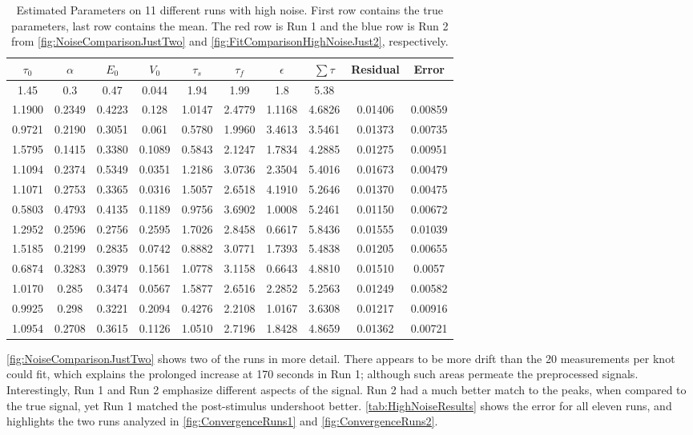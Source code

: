 \begin{table}[t]
\centering
\begin{tabular}{|c | c | c | c | c | c | c | c | c | c |}
\hline
$\tau_0$ & $\alpha$ & $E_0$    & $V_0$    & $\tau_s$ & $\tau_f$ & $\epsilon$  & $ \sum \tau $ & Residual  & Error\\
\hline
\rowcolor[gray]{.8}
1.45 & 0.3 & 0.47 & 0.044 & 1.94 & 1.99 & 1.8  & 5.38 &  & \\
\hline
\hline
1.1900 & 0.2349 & 0.4223 & 0.128  & 1.0147 & 2.4779 & 1.1168 & 4.6826 &0.01406 & 0.00859\\
0.9721 & 0.2190 & 0.3051 & 0.061  & 0.5780 & 1.9960 & 3.4613 & 3.5461 &0.01373 & 0.00735\\
1.5795 & 0.1415 & 0.3380 & 0.1089 & 0.5843 & 2.1247 & 1.7834 & 4.2885 &0.01275 & 0.00951\\
1.1094 & 0.2374 & 0.5349 & 0.0351 & 1.2186 & 3.0736 & 2.3504 & 5.4016 &0.01673 & 0.00479 \\
1.1071 & 0.2753 & 0.3365 & 0.0316 & 1.5057 & 2.6518 & 4.1910 & 5.2646 &0.01370 & 0.00475\\
0.5803 & 0.4793 & 0.4135 & 0.1189 & 0.9756 & 3.6902 & 1.0008 & 5.2461 &0.01150 & 0.00672\\
\rowcolor[rgb]{.9,.5,.5}
1.2952 & 0.2596 & 0.2756 & 0.2595 & 1.7026 & 2.8458 & 0.6617 & 5.8436 &0.01555 & 0.01039\\
\rowcolor[rgb]{.5,.5,.9}
1.5185 & 0.2199 & 0.2835 & 0.0742 & 0.8882 & 3.0771 & 1.7393 & 5.4838 &0.01205 & 0.00655\\
0.6874 & 0.3283 & 0.3979 & 0.1561 & 1.0778 & 3.1158 & 0.6643 & 4.8810 &0.01510 & 0.0057 \\
1.0170 & 0.285  & 0.3474 & 0.0567 & 1.5877 & 2.6516 & 2.2852 & 5.2563 &0.01249 & 0.00582\\
0.9925 & 0.298  & 0.3221 & 0.2094 & 0.4276 & 2.2108 & 1.0167 & 3.6308 &0.01217 & 0.00916\\
\hline
1.0954 & 0.2708 & 0.3615 & 0.1126 & 1.0510 & 2.7196 & 1.8428 & 4.8659 &0.01362 & 0.00721\\
\hline
\end{tabular}
\caption{Estimated Parameters on 11 different runs with high noise. First row contains the true parameters,
last row contains the mean.
The red row is Run 1 and the blue row is Run 2 from  \autoref{fig:NoiseComparisonJustTwo}
and \autoref{fig:FitComparisonHighNoiseJust2}, respectively.}
\label{tab:HighNoiseResults}
\end{table}

\autoref{fig:NoiseComparisonJustTwo} shows two of the runs in more detail.
There appears
to be more drift than the 20 measurements per knot could fit, which explains
the prolonged increase at 170 seconds in Run 1; although such areas
permeate the preprocessed signals.
Interestingly, Run 1 and Run 2 emphasize
different aspects of the signal. Run 2 had a much better match to the
peaks, when compared to the true signal, yet Run 1 matched the post-stimulus
undershoot better.  \autoref{tab:HighNoiseResults} shows
the error  for all eleven runs, and highlights the two runs analyzed
in \autoref{fig:ConvergenceRuns1} and \autoref{fig:ConvergenceRuns2}.

